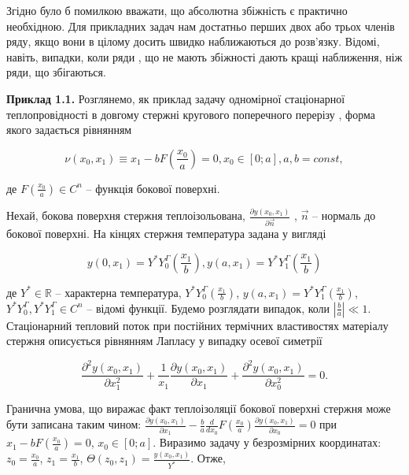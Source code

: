 Згідно \cite{Van-Dayk-Metody} було б помилкою вважати, що абсолютна збіжність є практично необхідною. Для прикладних задач нам
достатньо перших двох або трьох членів ряду, якщо вони в цілому досить швидко наближаються до розв’язку. Відомі,
навіть, випадки, коли ряди \cite{Van-Dayk-Metody}, що не мають збіжності дають кращі наближення, ніж ряди, що збігаються.

\textbf{Приклад 1.1.} Розглянемо, як приклад задачу одномірної стаціонарної теплопровідності в довгому стержні кругового
поперечного перерізу \cite{Coul-Metody}, форма якого задається рівнянням

$$
\nu(x_0, x_1) \equiv x_1 - b F \left( \frac{x_0}{a} \right) = 0, x_0 \in[0; a], a,b = const,
$$


де $F \left( \frac{x_0}{a} \right) \in C^n$  – функція бокової поверхні.

Нехай, бокова поверхня стержня теплоізольована, $\frac{\partial y(x_0, x_1)}{\partial \overrightarrow{n}}$ , $\overrightarrow{n}$
– нормаль до бокової поверхні. На кінцях стержня температура задана у вигляді

$$
y(0, x_1) = Y^*Y_0^\Gamma \left( \frac{x_1}{b} \right), y(a, x_1) = Y^*Y_1^\Gamma \left( \frac{x_1}{b} \right)
$$


де $Y^* \in  \mathbb{R}$ – характерна температура, $Y^*Y_0^\Gamma \left( \frac{x_1}{b} \right)$,
$y(a, x_1) = Y^*Y_1^\Gamma \left( \frac{x_1}{b} \right)$, $Y^*Y_0^\Gamma, Y^*Y_1^\Gamma \in C^n$  – відомі функції. Будемо розглядати випадок,
коли $\left| \frac{b}{a} \right| \ll 1$. Стаціонарний
тепловий поток при постійних термічних властивостях матеріалу стержня описується  рівнянням Лапласу у випадку осевої симетрії

$$
\frac{\partial^2 y(x_0, x_1)}{\partial x_1^2} + \frac{1}{x_1} \frac{\partial y(x_0, x_1)}{\partial x_1} +
\frac{\partial^2 y(x_0, x_1)}{\partial x_0^2} = 0.
$$

Гранична умова, що виражає факт теплоізоляції бокової поверхні стержня може бути записана таким чином:
$\frac{\partial y(x_0, x_1)}{\partial x_1} - \frac{b}{a} \frac{d}{d x_0} F \left( \frac{x_0}{a} \right)
\frac{\partial y(x_0, x_1)}{\partial x_0} = 0$
 при $ x_1 - b F \left(\frac{x_0}{a} \right) = 0$, $x_0 \in [0; a]$. %
Виразимо задачу у безрозмірних координатах: $z_0 = \frac{x_0}{a}$, $z_1=\frac{x_1}{b}$,
$\Theta(z_0, z_1) = \frac{y(x_0,x_1)}{Y^*}$. Отже,

